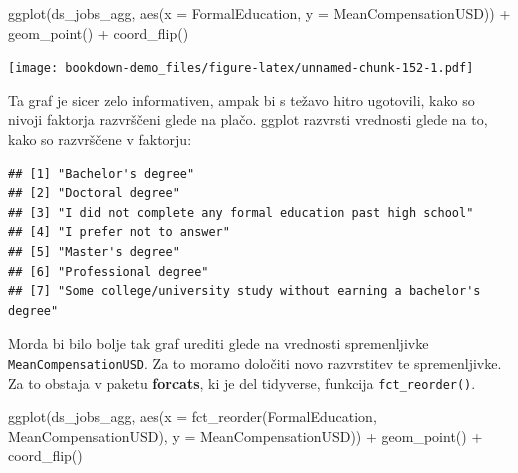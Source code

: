 \documentclass[
]{book}
\newenvironment{Shaded}{\begin{snugshade}}{\end{snugshade}}
\newcommand{\AttributeTok}[1]{\textcolor[rgb]{0.77,0.63,0.00}{#1}}
\newcommand{\FunctionTok}[1]{\textcolor[rgb]{0.00,0.00,0.00}{#1}}
\newcommand{\NormalTok}[1]{#1}
\newcommand{\SpecialCharTok}[1]{\textcolor[rgb]{0.00,0.00,0.00}{#1}}
\begin{document}
\begin{Shaded}
\begin{Highlighting}[]
\FunctionTok{ggplot}\NormalTok{(ds\_jobs\_agg, }\FunctionTok{aes}\NormalTok{(}\AttributeTok{x =}\NormalTok{ FormalEducation, }\AttributeTok{y =}\NormalTok{ MeanCompensationUSD)) }\SpecialCharTok{+}
  \FunctionTok{geom\_point}\NormalTok{() }\SpecialCharTok{+}
  \FunctionTok{coord\_flip}\NormalTok{()}
\end{Highlighting}
\end{Shaded}

\texttt{[image: bookdown-demo\_files/figure-latex/unnamed-chunk-152-1.pdf]}

Ta graf je sicer zelo informativen, ampak bi s težavo hitro ugotovili, kako so nivoji faktorja razvrščeni glede na plačo. ggplot razvrsti vrednosti glede na to, kako so razvrščene v faktorju:

\begin{Shaded}
\end{Shaded}

\begin{verbatim}
## [1] "Bachelor's degree"                                                
## [2] "Doctoral degree"                                                  
## [3] "I did not complete any formal education past high school"         
## [4] "I prefer not to answer"                                           
## [5] "Master's degree"                                                  
## [6] "Professional degree"                                              
## [7] "Some college/university study without earning a bachelor's degree"
\end{verbatim}

Morda bi bilo bolje tak graf urediti glede na vrednosti spremenljivke \texttt{MeanCompensationUSD}. Za to moramo določiti novo razvrstitev te spremenljivke. Za to obstaja v paketu \textbf{forcats}, ki je del tidyverse, funkcija \texttt{fct\_reorder()}.

\begin{Shaded}
\begin{Highlighting}[]
\FunctionTok{ggplot}\NormalTok{(ds\_jobs\_agg, }\FunctionTok{aes}\NormalTok{(}\AttributeTok{x =} \FunctionTok{fct\_reorder}\NormalTok{(FormalEducation, MeanCompensationUSD), }\AttributeTok{y =}\NormalTok{ MeanCompensationUSD)) }\SpecialCharTok{+}
  \FunctionTok{geom\_point}\NormalTok{() }\SpecialCharTok{+}
  \FunctionTok{coord\_flip}\NormalTok{()}
\end{Highlighting}
\end{Shaded}
\end{document}
